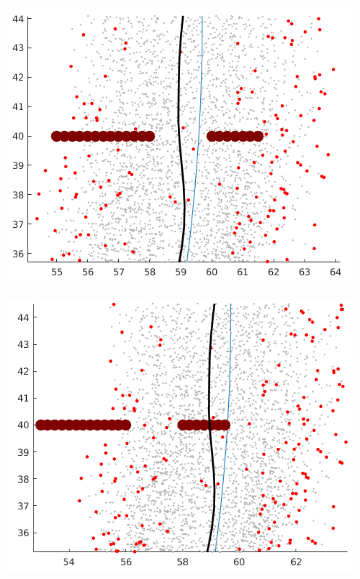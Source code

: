 \begin{figure}[h]
\begin{subfigure}{.24\textwidth}
	\includegraphics[width=\textwidth]{figures/dyn_prog_dis_3_low.png}
	\end{subfigure}
	\begin{subfigure}{.24\textwidth}
	\includegraphics[width=\textwidth]{figures/dyn_prog_dis_4_low.png}
	\end{subfigure}
	\begin{subfigure}{.24\textwidth}

\end{subfigure}
\end{figure}
